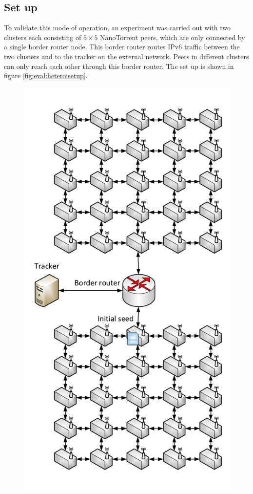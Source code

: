 \subsection{Set up}
To validate this mode of operation, an experiment was carried out with two clusters each consisting of $5 \times 5$ NanoTorrent peers, which are only connected by a single border router node. This border router routes \gls{IPv6} traffic between the two clusters and to the tracker on the external network. Peers in different clusters can only reach each other through this border router. The set up is shown in figure \ref{fig:eval:hetero:setup}.

\begin{figure}
    \centering
    \includegraphics[height=.9\textheight]{diagrams/experiment-cluster.pdf}

\end{figure}
